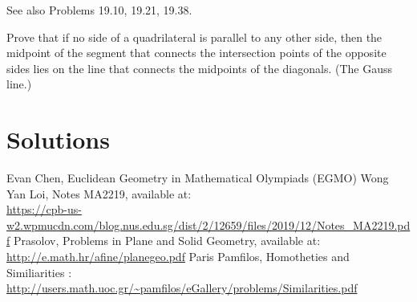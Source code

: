 \documentclass[11pt,twoside]{scrartcl}
\begin{document}
\begin{remark}
    \TBD See also Problems 19.10, 19.21, 19.38.
\end{remark}



Prove that if no side of a quadrilateral is parallel to any other side, then the midpoint of the segment that connects the intersection points of the opposite sides lies on the line that connects the midpoints of the diagonals. (The Gauss line.)

\begin{problem}
    \TBD
    \begin{sketch}
        \TBD 
    \end{sketch}
\end{problem}

\begin{problem}
    \TBD
    \begin{sketch}
        \TBD 
    \end{sketch}
\end{problem}


\clearpage
\section{Solutions}
\makehints

\clearpage

\begin{thebibliography}{99}
     Evan Chen, Euclidean Geometry in Mathematical Olympiads (EGMO)
     Wong Yan Loi, Notes MA2219, available at: \\ \url{https://cpb-us-w2.wpmucdn.com/blog.nus.edu.sg/dist/2/12659/files/2019/12/Notes_MA2219.pdf} 
     Prasolov, Problems in Plane and Solid Geometry, available at: \\ \url{http://e.math.hr/afine/planegeo.pdf}
	 Paris Pamfilos, Homotheties and Similiarities : \\ \url{http://users.math.uoc.gr/~pamfilos/eGallery/problems/Similarities.pdf}
\end{thebibliography}
\end{document}
